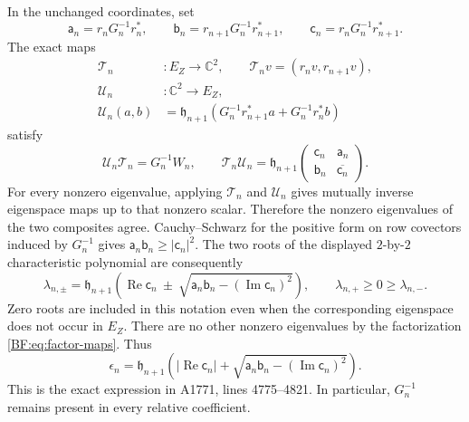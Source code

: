 In the unchanged coordinates, set
\begin{equation}
\mathsf a_n=r_nG_n^{-1}r_n^*,\qquad
\mathsf b_n=r_{n+1}G_n^{-1}r_{n+1}^*,\qquad
\mathsf c_n=r_nG_n^{-1}r_{n+1}^*.
\tag{BF.19}\label{BF:eq:abc}
\end{equation}
The exact maps
\begin{equation}
\begin{split}
\mathcal T_n&:E_Z\longrightarrow\mathbb C^2,
\qquad\mathcal T_nv=(r_nv,r_{n+1}v),\\
\mathcal U_n&:\mathbb C^2\longrightarrow E_Z,\\
\mathcal U_n(a,b)
 &=\mathfrak h_{n+1}
    \left(G_n^{-1}r_{n+1}^*a+G_n^{-1}r_n^*b\right)
\end{split}
\tag{BF.20}\label{BF:eq:factor-maps}
\end{equation}
satisfy
\[
\mathcal U_n\mathcal T_n=G_n^{-1}W_n,\qquad
\mathcal T_n\mathcal U_n
=\mathfrak h_{n+1}
  \begin{pmatrix}
   \mathsf c_n&\mathsf a_n\\
   \mathsf b_n&\overline{\mathsf c_n}
  \end{pmatrix}.
\]
For every nonzero eigenvalue, applying \(\mathcal T_n\) and
\(\mathcal U_n\) gives mutually inverse eigenspace maps up to that
nonzero scalar.  Therefore the nonzero eigenvalues of the two
composites agree.  Cauchy--Schwarz for the positive form on row
covectors induced by \(G_n^{-1}\) gives
\(\mathsf a_n\mathsf b_n\ge|\mathsf c_n|^2\).
The two roots of the displayed \(2\)-by-\(2\) characteristic
polynomial are consequently
\begin{equation}
\lambda_{n,\pm}
=\mathfrak h_{n+1}
 \left(\operatorname{Re}\mathsf c_n
 \ \pm\
 \sqrt{\mathsf a_n\mathsf b_n-
               (\operatorname{Im}\mathsf c_n)^2}\right),
\qquad \lambda_{n,+}\ge0\ge\lambda_{n,-}.
\tag{BF.21}\label{BF:eq:two-roots}
\end{equation}
Zero roots are included in this notation even when the corresponding
eigenspace does not occur in \(E_Z\).
There are no other nonzero eigenvalues by the factorization
\eqref{BF:eq:factor-maps}.  Thus
\begin{equation}
\epsilon_n=\mathfrak h_{n+1}
\left(
 |\operatorname{Re}\mathsf c_n|
 +\sqrt{\mathsf a_n\mathsf b_n-
                  (\operatorname{Im}\mathsf c_n)^2}
\right).
\tag{BF.22}\label{BF:eq:explicit-excess}
\end{equation}
This is the exact expression in A1771, lines 4775--4821.
In particular, \(G_n^{-1}\) remains present in every relative
coefficient.

